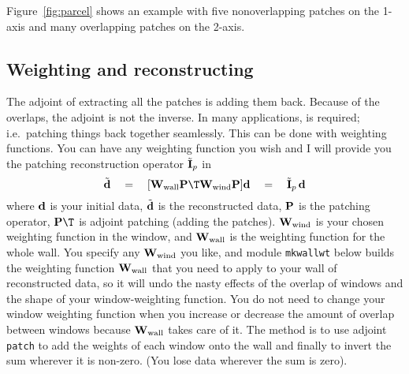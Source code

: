
Figure~\ref{fig:parcel} shows an example with five
nonoverlapping patches on the 1-axis and many overlapping patches
on the 2-axis.

\subsection{Weighting and reconstructing}
\par
The adjoint of extracting all the patches is adding them back.
Because of the overlaps, the adjoint is not the inverse.
In many applications,  is required;
i.e.~patching things back together seamlessly.
This can be done with weighting functions.
You can have any weighting function you wish
and I will provide you
the patching reconstruction operator $\tilde{\bold I}_p$ in
\begin{equation}
\tilde {\bold d}
\quad = \quad 
[ \bold W_{\rm wall} \bold P\T \bold W_{\rm wind} \bold P ] \bold d
\quad = \quad 
\tilde{\bold I}_p \, \bold d
\label{eqn:idemeqn}
\end{equation}
where $\bold d$ is your initial data,
$\tilde{\bold d}$ is the reconstructed data,
$\bold P$ is the patching operator,
$\bold P\T$ is adjoint patching (adding the patches).
$\bold W_{\rm wind}$ is your chosen weighting function in the window, and 
$\bold W_{\rm wall}$ is the weighting function
for the whole wall.
You specify any $\bold W_{\rm wind}$ you like,
and module \texttt{mkwallwt} below
builds the weighting function $\bold W_{\rm wall}$
that you need to apply
to your wall of reconstructed data,
so it will undo the nasty effects of the overlap of windows
and the shape of your window-weighting function.
You do not need to change your window weighting function
when you increase or decrease the amount of overlap
between windows because
$\bold W_{\rm wall}$
takes care of it.
The method is to
use adjoint \texttt{patch} 
to add the weights of each window onto the wall
and finally to invert the sum wherever it is non-zero.
(You lose data wherever the sum is zero).


